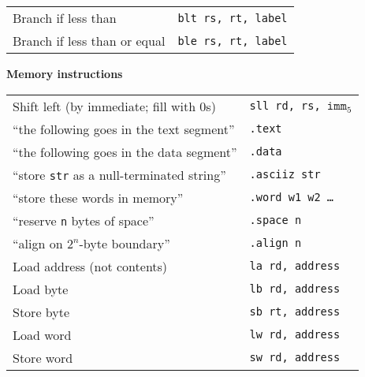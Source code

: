 \documentclass{article}
\newcommand{\pseudo}{{\ensuremath\ast}}
\begin{document}
\begin{center}
\begin{tabular}{ll}
Branch if less than\pseudo & {\tt blt rs, rt, label} \\
Branch if less than or equal\pseudo & {\tt ble rs, rt, label} \\
\end{tabular}
\end{center}

\noindent
\textbf{Memory instructions}
\begin{center}
\begin{tabular}{ll}
Shift left (by immediate; fill with 0s) & {\tt sll rd, rs, }$\mathtt{imm}_5$ \\
``the following goes in the text segment'' & {\tt .text} \\
``the following goes in the data segment'' & {\tt .data} \\
``store {\tt str} as a null-terminated string'' & {\tt .asciiz str} \\
``store these words in memory'' & {\tt .word w1 w2 \ldots} \\
``reserve {\tt n} bytes of space'' & {\tt .space n} \\
``align on $2^n$-byte boundary'' & {\tt .align n} \\
Load address (not contents) \pseudo & {\tt la rd, address} \\
Load byte & {\tt lb rd, address} \\
Store byte & {\tt sb rt, address} \\
Load word & {\tt lw rd, address} \\
Store word & {\tt sw rd, address} \\
\end{tabular}
\end{center}
\end{document}

